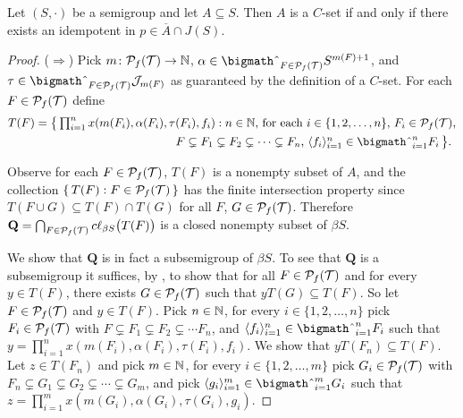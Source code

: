 \begin{thm}
  \label{thm:csets}
  Let $(S, \cdot)$ be a semigroup and let $A \subseteq S$. 
  Then $A$ is a $C$-set if and only if there exists an idempotent in $p \in \overline{A} \cap J(S)$.
\end{thm}
\begin{proof}
  ($\Rightarrow$)
  Pick $m \colon \mathcal{P}_f(\mathcal{T}) \to \mathbb{N}$, $\alpha \in \bigtimes_{F \in \Pf(\calT)} S^{m(F)+1}$, and $\tau \in \bigtimes_{F \in \Pf(\calT)} \calJ_{m(F)}$ as guaranteed by the definition of a $C$-set. 
  For each $F \in \mathcal{P}_f(\mathcal{T})$ define 
  \begin{align*}
    T(F) &= \bigl\{\, \textstyle \prod_{i=1}^n x(m(F_i), \alpha(F_i), \tau(F_i), f_i) : \mbox{$n \in \bbN$, for each $i \in \{1, 2, \ldots, n\}$, $F_i \in \Pf(\calT)$,}\\
 &\hspace{12em}\mbox{$F \subsetneq F_1 \subsetneq F_2 \subsetneq \cdots \subsetneq F_n$, $\la f_i \ra_{i=1}^n \in \bigtimes_{i=1}^n F_i$} \,\bigr\}.
  \end{align*}

  Observe for each $F \in \mathcal{P}_f(\mathcal{T})$, $T(F)$ is a nonempty subset of $A$, and the collection $\{\, T(F) : F \in \mathcal{P}_f(\mathcal{T}) \,\}$ has the finite intersection property since $T(F \cup G) \subseteq T(F) \cap T(G)$ for all $F$, $G \in \mathcal{P}_f(\mathcal{T})$.
  Therefore $\mathbf{Q} = \bigcap_{F \in \mathcal{P}_f(\mathcal{T})} c\ell_{\beta S}\bigl(T(F)\bigr)$ is a closed nonempty subset of $\beta S$. 

  We show that $\mathbf{Q}$ is in fact a subsemigroup of $\beta S$.
  To see that $\mathbf{Q}$ is a subsemigroup it suffices, by \cite[Theorem 4.20]{Hindman:1998fk}, to show that for all $F \in \mathcal{P}_f(\mathcal{T})$ and for every $y \in T(F)$, there exists $G \in \mathcal{P}_f(\mathcal{T})$ such that $yT(G) \subseteq T(F)$. 
  So let $F \in \mathcal{P}_f(\mathcal{T})$ and $y \in T(F)$.
  Pick $n \in \mathbb{N}$, for every $i \in \{1, 2, \ldots, n\}$ pick $F_i \in \mathcal{P}_f(\mathcal{T})$ with $F \subsetneq F_1 \subsetneq F_2 \subsetneq \cdots F_n$, and $\la f_i \ra_{i=1}^n \in \bigtimes_{i=1}^n F_i$ such that $y = \prod_{i=1}^n x(m(F_i), \alpha(F_i), \tau(F_i), f_i)$. 
  We show that $yT(F_n) \subseteq T(F)$.
  Let $z \in T(F_n)$ and pick $m \in \mathbb{N}$, for every $i \in \{1, 2, \ldots, m\}$ pick $G_i \in \mathcal{P}_f(\mathcal{T})$ with $F_n \subsetneq G_1 \subsetneq G_2 \subsetneq \cdots \subsetneq G_m$, and pick $\la g_i \ra_{i=1}^m \in \bigtimes_{i=1}^m G_i$ such that $z = \prod_{i=1}^m x(m(G_i), \alpha(G_i), \tau(G_i), g_i)$.


\end{proof}
